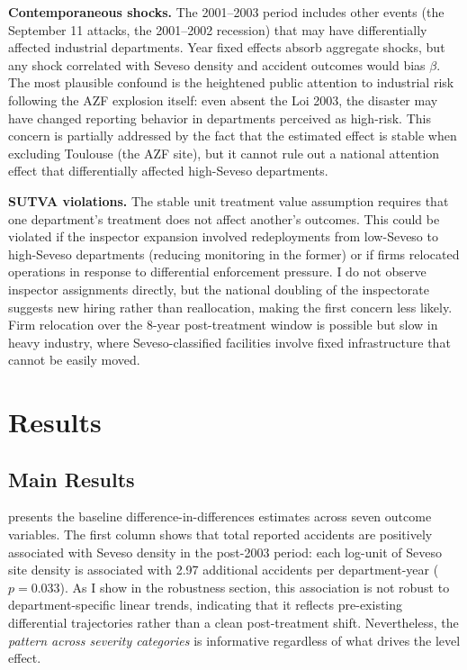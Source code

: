 \documentclass[12pt]{article}
\begin{document}
\textbf{Contemporaneous shocks.} The 2001--2003 period includes other events (the September 11 attacks, the 2001--2002 recession) that may have differentially affected industrial departments. Year fixed effects absorb aggregate shocks, but any shock correlated with Seveso density and accident outcomes would bias $\beta$. The most plausible confound is the heightened public attention to industrial risk following the AZF explosion itself: even absent the Loi 2003, the disaster may have changed reporting behavior in departments perceived as high-risk. This concern is partially addressed by the fact that the estimated effect is stable when excluding Toulouse (the AZF site), but it cannot rule out a national attention effect that differentially affected high-Seveso departments.

\textbf{SUTVA violations.} The stable unit treatment value assumption requires that one department's treatment does not affect another's outcomes. This could be violated if the inspector expansion involved redeployments from low-Seveso to high-Seveso departments (reducing monitoring in the former) or if firms relocated operations in response to differential enforcement pressure. I do not observe inspector assignments directly, but the national doubling of the inspectorate suggests new hiring rather than reallocation, making the first concern less likely. Firm relocation over the 8-year post-treatment window is possible but slow in heavy industry, where Seveso-classified facilities involve fixed infrastructure that cannot be easily moved.


\section{Results}
\label{sec:results}

\subsection{Main Results}

 presents the baseline difference-in-differences estimates across seven outcome variables. The first column shows that total reported accidents are positively associated with Seveso density in the post-2003 period: each log-unit of Seveso site density is associated with 2.97 additional accidents per department-year ($p = 0.033$). As I show in the robustness section, this association is not robust to department-specific linear trends, indicating that it reflects pre-existing differential trajectories rather than a clean post-treatment shift. Nevertheless, the \textit{pattern across severity categories} is informative regardless of what drives the level effect.
\end{document}
